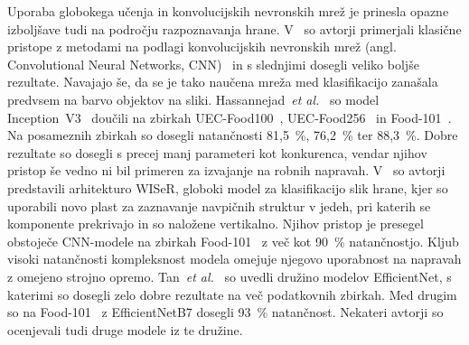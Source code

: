 \documentclass[a4paper,twoside,openright,12pt,slovene]{book}
\newcommand{\etal}{\textit{et al.}} %
\begin{document}
            Uporaba globokega učenja in konvolucijskih nevronskih mrež je
            prinesla opazne izboljšave tudi na področju razpoznavanja hrane.
            V~\cite{src:kagaya2014food} so avtorji primerjali klasične pristope
            z metodami na podlagi konvolucijskih nevronskih mrež (angl.
            Convolutional Neural Networks,
            CNN)~\cite{src:krizhevsky2012imagenet} in s slednjimi dosegli
            veliko boljše rezultate. Navajajo še, da se je tako naučena mreža
            med klasifikacijo zanašala predvsem na barvo objektov na sliki.
            Hassannejad~\etal~\cite{src:hassannejad2016food} so model
            Inception~V3~\cite{src:szegedy2016rethinking} doučili na zbirkah
            UEC-Food100~\cite{src:matsuda2012recognition},
            UEC-Food256~\cite{src:kawano2014automatic} in
            Food-101~\cite{src:bossard2014food}. Na posameznih zbirkah so
            dosegli natančnosti 81{,}5~\%, 76{,}2~\% ter 88{,}3~\%. Dobre
            rezultate so dosegli s precej manj parameteri kot konkurenca,
            vendar njihov pristop še vedno ni bil primeren za izvajanje na
            robnih napravah.
            V~\cite{src:martinel2018wide} so avtorji predstavili arhitekturo
            WISeR, globoki model za klasifikacijo slik hrane, kjer so uporabili
            novo plast za zaznavanje navpičnih struktur v jedeh, pri katerih
            se komponente prekrivajo in so naložene vertikalno. Njihov pristop
            je presegel obstoječe CNN-modele na zbirkah
            Food-101~\cite{src:bossard2014food} z več kot 90~\% natančnostjo.
            Kljub visoki natančnosti kompleksnost modela omejuje njegovo
            uporabnost na napravah z omejeno strojno opremo.
            Tan~\etal~\cite{src:tan2019efficientnet} so uvedli družino modelov
            EfficientNet, s katerimi so dosegli zelo dobre rezultate na več
            podatkovnih zbirkah. Med drugim so na
            Food-101~\cite{src:bossard2014food} z EfficientNetB7 dosegli 93~\%
            natančnost.
            Nekateri avtorji so ocenjevali tudi druge modele iz te družine.
\end{document}
